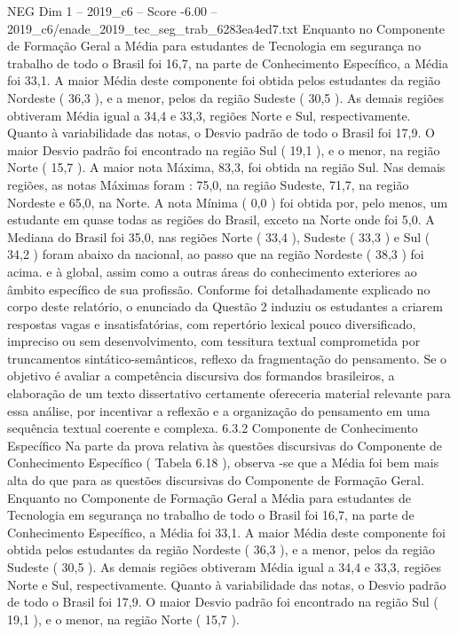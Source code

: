 \begin{textsample}{NEG Dim 1 – 2019\_c6 – Score -6.00 – 2019\_c6/enade\_2019\_tec\_seg\_trab\_6283ea4ed7.txt}
Enquanto no Componente de Formação Geral a Média para estudantes de Tecnologia em segurança no trabalho de todo o Brasil foi 16,7, na parte de Conhecimento Específico, a Média foi 33,1.
A maior Média deste componente foi obtida pelos estudantes da região Nordeste ( 36,3 ), e a menor, pelos da região Sudeste ( 30,5 ).
As demais regiões obtiveram Média igual a 34,4 e 33,3, regiões Norte e Sul, respectivamente.
Quanto à variabilidade das notas, o Desvio padrão de todo o Brasil foi 17,9.
O maior Desvio padrão foi encontrado na região Sul ( 19,1 ), e o menor, na região Norte ( 15,7 ).
A maior nota Máxima, 83,3, foi obtida na região Sul.
Nas demais regiões, as notas Máximas foram : 75,0, na região Sudeste, 71,7, na região Nordeste e 65,0, na Norte.
A nota Mínima ( 0,0 ) foi obtida por, pelo menos, um estudante em quase todas as regiões do Brasil, exceto na Norte onde foi 5,0.
A Mediana do Brasil foi 35,0, nas regiões Norte ( 33,4 ), Sudeste ( 33,3 ) e Sul ( 34,2 ) foram abaixo da nacional, ao passo que na região Nordeste ( 38,3 ) foi acima. e à global, assim como a outras áreas do conhecimento exteriores ao âmbito específico de sua profissão.
Conforme foi detalhadamente explicado no corpo deste relatório, o enunciado da Questão 2 induziu os estudantes a criarem respostas vagas e insatisfatórias, com repertório lexical pouco diversificado, impreciso ou sem desenvolvimento, com tessitura textual comprometida por truncamentos sintático-semânticos, reflexo da fragmentação do pensamento.
Se o objetivo é avaliar a competência discursiva dos formandos brasileiros, a elaboração de um texto dissertativo certamente ofereceria material relevante para essa análise, por incentivar a reflexão e a organização do pensamento em uma sequência textual coerente e complexa. 6.3.2 Componente de Conhecimento Específico Na parte da prova relativa às questões discursivas do Componente de Conhecimento Específico ( Tabela 6.18 ), observa -se que a Média foi bem mais alta do que para as questões discursivas do Componente de Formação Geral.
Enquanto no Componente de Formação Geral a Média para estudantes de Tecnologia em segurança no trabalho de todo o Brasil foi 16,7, na parte de Conhecimento Específico, a Média foi 33,1.
A maior Média deste componente foi obtida pelos estudantes da região Nordeste ( 36,3 ), e a menor, pelos da região Sudeste ( 30,5 ).
As demais regiões obtiveram Média igual a 34,4 e 33,3, regiões Norte e Sul, respectivamente.
Quanto à variabilidade das notas, o Desvio padrão de todo o Brasil foi 17,9.
O maior Desvio padrão foi encontrado na região Sul ( 19,1 ), e o menor, na região Norte ( 15,7 ).

\end{textsample}
